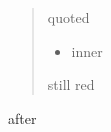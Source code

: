 \begin{quote}
\color{red} quoted \begin{itemize}\item inner\end{itemize} still red
\end{quote}
after
